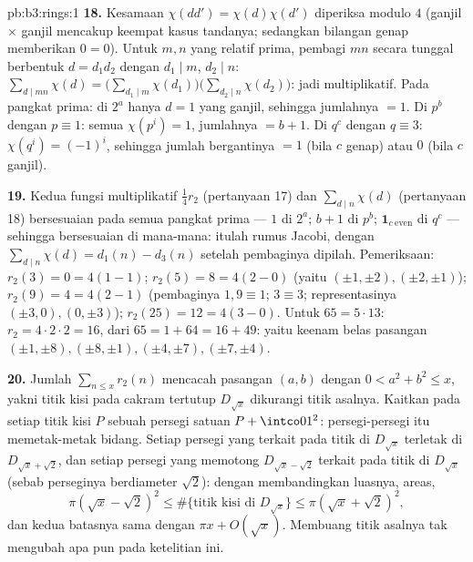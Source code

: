 \begin{solution}{pb:b3:rings:1}
\textbf{18.} Kesamaan $\chi(dd') = \chi(d)\chi(d')$ diperiksa modulo $4$
(ganjil $\times$ ganjil mencakup keempat kasus tandanya; sedangkan bilangan genap
memberikan $0 = 0$). Untuk $m, n$ yang relatif prima, pembagi $mn$
secara tunggal berbentuk $d = d_1d_2$ dengan $d_1 \mid m$, $d_2 \mid n$:
$\sum_{d \mid mn}\chi(d) = \bigl(\sum_{d_1\mid
m}\chi(d_1)\bigr)\bigl(\sum_{d_2\mid n}\chi(d_2)\bigr)$: jadi
multiplikatif. Pada pangkat prima: di $2^a$ hanya $d = 1$ yang ganjil,
sehingga jumlahnya $= 1$. Di $p^b$ dengan $p \equiv 1$: semua $\chi(p^i) = 1$,
jumlahnya $= b + 1$. Di $q^c$ dengan $q \equiv 3$: $\chi(q^i) =
(-1)^i$, sehingga jumlah bergantinya $= 1$ (bila $c$ genap) atau $0$ (bila $c$ ganjil).

\textbf{19.} Kedua fungsi multiplikatif
$\frac14r_2$ (pertanyaan 17) dan $\sum_{d\mid n}\chi(d)$
(pertanyaan 18) bersesuaian pada semua pangkat prima --- $1$ di $2^a$;
$b + 1$ di $p^b$; $\mathbf 1_{c\ \mathrm{even}}$ di $q^c$ ---
sehingga bersesuaian di mana-mana: itulah rumus Jacobi, dengan $\sum_{d\mid
n}\chi(d) = d_1(n) - d_3(n)$ setelah pembaginya dipilah. Pemeriksaan:
$r_2(3) = 0 = 4(1 - 1)$; $r_2(5) = 8 = 4(2 - 0)$
(yaitu $(\pm1,\pm2), (\pm2,\pm1)$); $r_2(9) = 4 = 4(2 - 1)$
(pembaginya $1, 9 \equiv 1$; $3 \equiv 3$; representasinya
$(\pm3, 0), (0, \pm3)$); $r_2(25) = 12 = 4(3 - 0)$. Untuk $65 =
5\cdot13$: $r_2 = 4\cdot2\cdot2 = 16$, dari $65 = 1 + 64 = 16
+ 49$: yaitu keenam belas pasangan $(\pm1, \pm8), (\pm8, \pm1), (\pm4,
\pm7), (\pm7, \pm4)$.

\textbf{20.} Jumlah $\sum_{n \leq x}r_2(n)$ mencacah pasangan $(a, b)$
dengan $0 < a^2 + b^2 \leq x$, yakni titik kisi pada
cakram tertutup $D_{\sqrt x}$ dikurangi titik asalnya. Kaitkan pada setiap
titik kisi $P$ sebuah persegi satuan $P + \intco01^2$: persegi-persegi itu
memetak-metak bidang. Setiap persegi yang terkait pada titik di
$D_{\sqrt x}$ terletak di $D_{\sqrt x + \sqrt2}$, dan setiap persegi yang
memotong $D_{\sqrt x - \sqrt 2}$ terkait pada titik di
$D_{\sqrt x}$ (sebab perseginya berdiameter $\sqrt 2$): dengan membandingkan
luasnya,
areas,
\[
\pi(\sqrt x - \sqrt2)^2 \leq \#\{\text{titik kisi di }
D_{\sqrt x}\} \leq \pi(\sqrt x + \sqrt 2)^2,
\]
dan kedua batasnya sama dengan $\pi x + O(\sqrt x)$. Membuang titik asalnya
tak mengubah apa pun pada ketelitian ini.


\end{solution}
